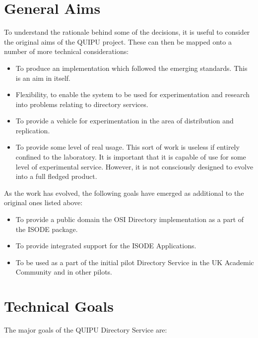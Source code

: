 \section {General Aims}

To understand the rationale behind some of the decisions, it is
useful to consider the original aims of the QUIPU project.
These
can then be mapped onto a number
of more technical considerations:

\begin {itemize}
\item To produce an implementation which followed the
emerging standards.  This is an aim in itself.

\item Flexibility, to enable the system to be used
for experimentation and research into problems relating to directory
services.

\item To provide a vehicle for experimentation in the area of
distribution and replication.

\item To provide some level of real usage.
This sort of work is useless if entirely confined to the laboratory.
It is important that it is capable of use for some level of experimental
service.  However, it is not consciously designed to evolve into a full
fledged product.
\end {itemize}

As the work has evolved, the following goals have emerged as
additional to the original ones listed above:

\begin {itemize}
\item To provide a public domain the OSI Directory implementation as a part of
the ISODE package.

\item To provide integrated support for the ISODE Applications.

\item To be used as a part of the initial pilot Directory Service in
the UK Academic Community and in other pilots.
\end {itemize}


\section {Technical Goals}

The major goals of the QUIPU Directory Service are:


